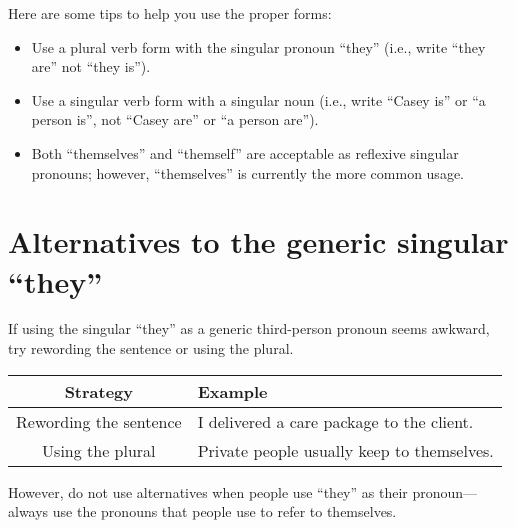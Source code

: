 Here are some tips to help you use the proper forms:
\begin{itemize}
    \item Use a plural verb form with the singular pronoun \enquote{they} (i.e., write \enquote{they are} not \enquote{they is}).
    \item Use a singular verb form with a singular noun (i.e., write \enquote{Casey is} or \enquote{a person is}, not \enquote{Casey are} or \enquote{a person are}).
    \item Both \enquote{themselves} and \enquote{themself} are acceptable as reflexive singular pronouns; however, \enquote{themselves} is currently the more common usage.
\end{itemize}

\section{Alternatives to the generic singular \enquote{they}}

If using the singular \enquote{they} as a generic third-person pronoun seems awkward, try rewording the sentence or using the plural.

    \begin{table}[htb]
        \centering
        \begin{tabular}{|c|l|}
            \hline
            \rowcolor[HTML]{DDE7FA}
            Strategy               & Example                                    \\ \hline
            Rewording the sentence & I delivered a care package to the client.  \\ \hline
            Using the plural       & Private people usually keep to themselves. \\ \hline
        \end{tabular}
    \end{table}

However, do not use alternatives when people use \enquote{they} as their pronoun—always use the pronouns that people use to refer to themselves.